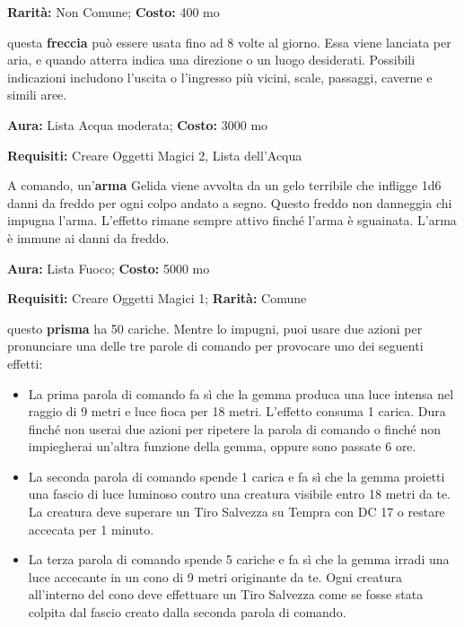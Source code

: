 \begin{multicols}{2}
\textbf{Rarità:} Non Comune; \textbf{Costo:} 400 mo

questa \textbf{freccia} può essere usata fino ad 8 volte al giorno. Essa viene lanciata per aria, e quando atterra indica una direzione o un luogo desiderati. Possibili indicazioni includono l'uscita o l'ingresso più vicini, scale, passaggi, caverne e simili aree.


\textbf{Aura:} Lista Acqua moderata; \textbf{Costo:} 3000 mo

\textbf{Requisiti:} Creare Oggetti Magici 2, Lista dell'Acqua

A comando, un'\textbf{arma} Gelida viene avvolta da un gelo terribile che infligge 1d6 danni da freddo per ogni colpo andato a segno. Questo freddo non danneggia chi impugna l'arma. L'effetto rimane sempre attivo finché l'arma è sguainata. L'arma è immune ai danni da freddo.


\textbf{Aura:} Lista Fuoco; \textbf{Costo:} 5000 mo

\textbf{Requisiti:} Creare Oggetti Magici 1; \textbf{Rarità:} Comune

questo \textbf{prisma} ha 50 cariche. Mentre lo impugni, puoi usare due azioni per pronunciare una delle tre parole di comando per provocare uno dei seguenti effetti:

\begin{itemize}[leftmargin=*] \setlength{\itemsep}{0pt}
\item
La prima parola di comando fa sì che la gemma produca una luce intensa nel raggio di 9 metri e luce fioca per 18 metri. L'effetto consuma 1 carica. Dura finché non userai due azioni per ripetere la parola di comando o finché non impiegherai un'altra funzione della gemma, oppure sono passate 6 ore.

\item
La seconda parola di comando spende 1 carica e fa sì che la gemma proietti una fascio di luce luminoso contro una creatura visibile entro 18 metri da te. La creatura deve superare un Tiro Salvezza su Tempra con DC 17 o restare accecata per 1 minuto.

\item
La terza parola di comando spende 5 cariche e fa sì che la gemma irradi una luce accecante in un cono di 9 metri originante da te. Ogni creatura all'interno del cono deve effettuare un Tiro Salvezza come se fosse stata colpita dal fascio creato dalla seconda parola di comando.


\end{itemize}
\end{multicols}
